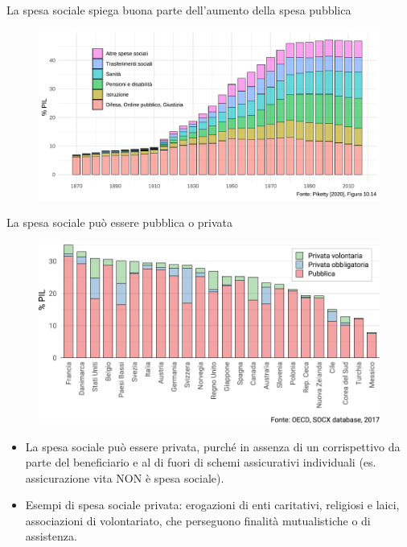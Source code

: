 \documentclass[aspectratio=64,11pt]{beamer}
\begin{document}
\begin{frame}{La spesa sociale spiega buona parte dell'aumento della spesa pubblica}
\begin{figure}[htbp]
\centering
\includegraphics[width=.95\textwidth]{./figure/evoluzione-spesa-Piketty.pdf}
\end{figure}
\end{frame}


\begin{frame}{La spesa sociale può essere pubblica o privata}
\begin{figure}[htbp]
\centering
\includegraphics[width=.85\textwidth]{./figure/spesa-sociale-pubblica-privata-color.pdf}
\end{figure}

\small
\begin{itemize}
\item La spesa sociale può essere privata, purché in assenza di un corrispettivo
da parte del beneficiario e al di fuori di schemi assicurativi individuali
(es. assicurazione vita NON è spesa sociale).
\item Esempi di spesa sociale privata: erogazioni di enti caritativi, religiosi e
laici, associazioni di volontariato, che perseguono finalità mutualistiche o
di assistenza.
\end{itemize}
\end{frame}
\end{document}
